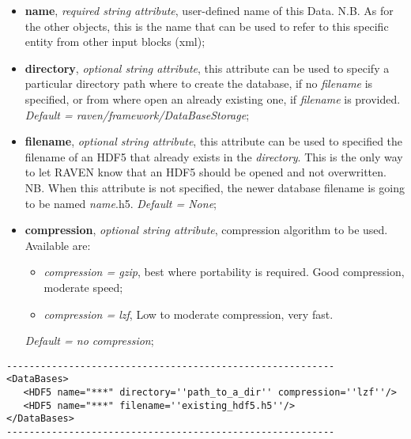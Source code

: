 \begin{itemize}
\itemsep0em
\item \textbf{name}, \textit{required string attribute}, user-defined name of this Data. N.B. As for the other objects, this is the name that can be used to refer to this specific entity from other input blocks (xml);
\item \textbf{directory}, \textit{optional string attribute}, this attribute can be used to specify a particular directory path where to create the database, if no \textit{filename} is specified, or from where open an already existing one, if \textit{filename} is provided. \textit{Default = raven/framework/DataBaseStorage};
\item \textbf{filename}, \textit{optional string attribute}, this attribute can be used to specified the filename of an HDF5 that already exists in the \textit{directory}. This is the only way to let RAVEN know that an HDF5 should be opened and not overwritten. NB. When this attribute is not specified, the newer database filename is going to be named \textit{name}.h5. \textit{Default = None};
\item \textbf{compression}, \textit{optional string attribute}, compression algorithm to be used. Available are:
   \begin{itemize}
      \item \textit{compression = gzip}, best where portability is required. Good compression, moderate speed;
      \item \textit{compression = lzf}, Low to moderate compression, very fast.
   \end{itemize}
  \textit{Default = no compression};
\end{itemize}

\begin{lstlisting}[style=XML]
----------------------------------------------------------
<DataBases> 
   <HDF5 name="***" directory=''path_to_a_dir'' compression=''lzf''/>
   <HDF5 name="***" filename=''existing_hdf5.h5''/>
</DataBases>
----------------------------------------------------------
\end{lstlisting}

